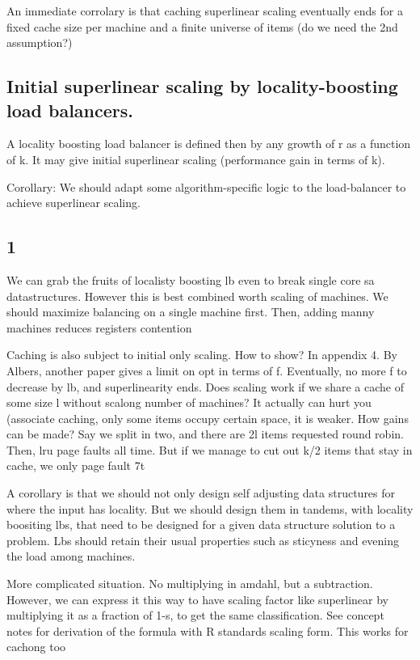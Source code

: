 An immediate corrolary is that caching superlinear scaling eventually ends for a fixed cache size per machine and a finite universe of items (do we need the 2nd assumption?)


\subsection{Initial superlinear scaling by locality-boosting load balancers.}



A locality boosting load balancer is defined then by any growth of r as a function of k. It may give initial superlinear scaling (performance gain in terms of k).

Corollary: We should adapt some algorithm-specific logic to the load-balancer to achieve superlinear scaling.



\subsection{1}


We can grab the fruits of localisty boosting lb even to break single core sa datastructures. However  this is best combined worth scaling of machines. We should maximize balancing on a single machine first. Then, adding manny machines reduces registers contention




Caching is also subject to initial only scaling. How to show? In appendix 4. By Albers, another paper gives a limit on opt in terms of f. Eventually, no more f to decrease by lb, and superlinearity ends. Does scaling work if we share a cache of some size l without scalong number of machines? It actually can hurt you (associate caching, only some items occupy certain space, it is weaker. How gains can be made? Say we split in two, and there are 2l items requested round robin. Then, lru page faults all time. But if we manage to cut out k/2 items that stay in cache, we only page fault 7t%


A corollary is that we should not only design self adjusting data structures for where the input has locality. But we should design them in tandems, with locality boositing lbs, that need to be designed for a given data structure solution to a problem. Lbs should retain their usual properties such as sticyness and evening the load among machines.

More complicated situation. No multiplying in amdahl, but a subtraction. However, we can express it this way to have scaling factor like superlinear by multiplying it as a fraction of 1-s, to get the same classification. See concept notes for derivation of the formula with R standards scaling form. This works for cachong too


